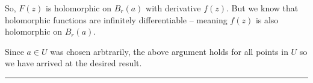 \documentclass{article}
\begin{document}
\vskip 0.5cm
So, $F(z)$ is holomorphic on $B_r(a)$ with derivative $f(z)$. But we know that holomorphic functions are infinitely differentiable -- meaning $f(z)$ is also holomorphic on $B_r(a)$.

\vskip 0.5cm
Since $a \in U$ was chosen arbtrarily, the above argument holds for all points in $U$ so we have arrived at the desired result.


\vskip 0.5cm
\hrule 
\vskip 0.5cm















\end{document}
